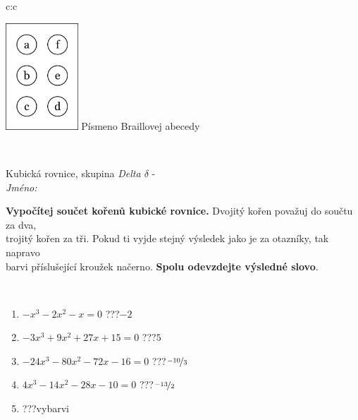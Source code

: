 \documentclass[10pt]{report}
\begin{document}
\begin{tabular}{c:c}
\begin{minipage}[c][104.5mm][t]{0.5\linewidth}
\begin{center}
\begin{minipage}{0.20\linewidth}
\begin{center}
\includegraphics[height=40mm]{../images/braille.png}
{\small Písmeno Braillovej abecedy}
\end{center}
\end{minipage}
\end{center}
\end{minipage}
\\ \hdashline
\begin{minipage}[c][104.5mm][t]{0.5\linewidth}
\begin{center}
\vspace{7mm}
{\huge Kubická rovnice, skupina \textit{Delta $\delta$} -}\\[5mm]
\textit{Jméno:}\phantom{xxxxxxxxxxxxxxxxxxxxxxxxxxxxxxxxxxxxxxxxxxxxxxxxxxxxxxxxxxxxxxxxx}\\[5mm]
\begin{minipage}{0.95\linewidth}
\begin{center}
\textbf{Vypočítej součet kořenů kubické rovnice.} Dvojitý kořen považuj do součtu za dva,\\trojitý kořen za tři. Pokud ti vyjde stejný výsledek jako je za otazníky, tak napravo\\barvi příslušející kroužek načerno. \textbf{Spolu odevzdejte výsledné slovo}.
\end{center}
\end{minipage}
\\[1mm]
\begin{minipage}{0.79\linewidth}
\begin{center}
\begin{varwidth}{\linewidth}
\begin{enumerate}
\Large
\item $-x^3-2x^2-x=0$\quad \dotfill\; ???\;\dotfill \quad $-2$
\item $-3x^3+9x^2+27x+15=0$\quad \dotfill\; ???\;\dotfill \quad $5$
\item $-24x^3-80x^2-72x-16=0$\quad \dotfill\; ???\;\dotfill \quad $\nicefrac{-10}{3}$
\item $4x^3-14x^2-28x-10=0$\quad \dotfill\; ???\;\dotfill \quad $\nicefrac{-13}{2}$
\item \quad \dotfill\; ???\;\dotfill \quad vybarvi

\end{enumerate}
\end{varwidth}
\end{center}
\end{minipage}
\end{center}
\end{minipage}
\end{tabular}
\end{document}
